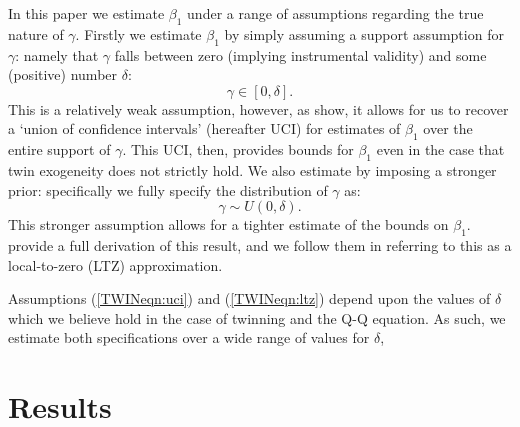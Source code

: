 \documentclass[subeqn]{article}
\begin{document}
\begin{spacing}{1.4}
In this paper we estimate $\beta_1$ under a range of assumptions regarding the
true nature of $\gamma$.  Firstly we estimate $\beta_1$ by simply assuming a
support assumption for $\gamma$: namely that $\gamma$ falls between zero (implying 
instrumental validity) and some (positive) number $\delta$:
\begin{equation}
\label{TWINeqn:uci}
\gamma \in [0,\delta].
\end{equation}
This is a relatively weak assumption, however, as \citet{Conleyetal2012} show,
it allows for us to recover a `union of confidence intervals' (hereafter UCI) 
for estimates of $\beta_1$ over the entire support of $\gamma$.  This UCI, then, 
provides bounds for $\beta_1$ even in the case that twin exogeneity does not 
strictly hold. We also estimate by imposing a stronger prior: specifically we 
fully specify the distribution of $\gamma$ as:
\begin{equation}
\label{TWINeqn:ltz}
\gamma \sim U(0,\delta).
\end{equation}
This stronger assumption allows for a tighter estimate of the bounds on 
$\beta_1$.  \citet{Conleyetal2012} provide a full derivation of this result, and 
we follow them in referring to this as a local-to-zero (LTZ) approximation.

Assumptions (\ref{TWINeqn:uci}) and (\ref{TWINeqn:ltz}) depend upon the values
of $\delta$ which we believe hold in the case of twinning and the Q-Q equation.
As such, we estimate both specifications over a wide range of values for 
$\delta$,  


\section{Results}                                  \label{TWINscn:results}

\end{spacing}
\end{document}
